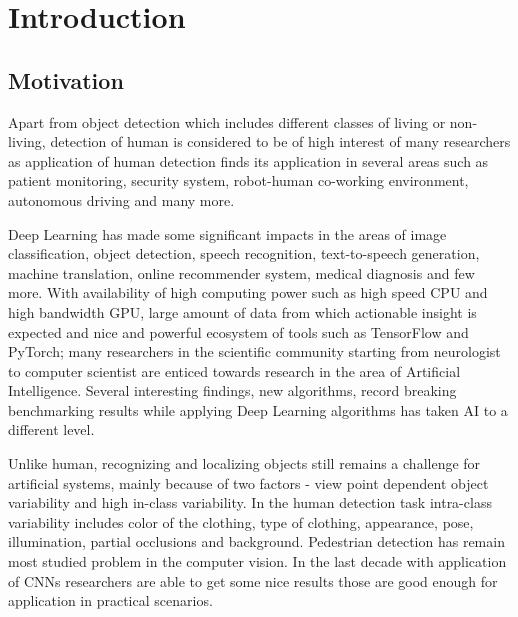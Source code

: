 \pagestyle{fancy}
\fancyhf{}
\fancyhead[EL]{\leftmark} %
\fancyhead[OL]{\leftmark}
\fancyhead[ER,OR]{\thepage}

\setcounter{page}{1}

\chapter{Introduction}
\section{Motivation}
Apart from object detection which includes different classes of living or non-living, detection of human is considered to be of high  interest of many researchers as application of human detection finds its application in several areas such as patient monitoring, security system, robot-human co-working environment, autonomous driving and many more.

\vspace{1em}
\noindent Deep Learning has made some significant impacts in the areas of image classification, 
object detection, speech recognition, text-to-speech generation, machine translation,
online recommender system, medical diagnosis and few more. With availability of high 
computing power such as high speed CPU and high bandwidth GPU, large amount of 
data from which actionable insight is expected and nice and powerful ecosystem of  
tools such as TensorFlow and PyTorch; many researchers in the scientific community 
starting from neurologist to computer scientist are enticed towards research in the area 
of Artificial Intelligence. Several interesting findings, new algorithms, record 
breaking benchmarking results while applying Deep Learning algorithms has taken 
AI to a different level.

\vspace{1em}
\noindent Unlike human, recognizing and localizing objects still remains a challenge for artificial 
systems, mainly because of two factors - view point dependent object variability and
high in-class variability. In the human detection task intra-class variability includes
color of the clothing, type of clothing, appearance, pose, illumination, partial occlusions
and background. Pedestrian detection has remain most studied problem in the computer vision.
In the last decade with application of CNNs researchers are able to get some nice results 
those are good enough for application in practical scenarios.


